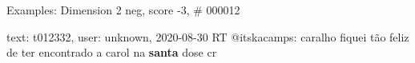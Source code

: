 \begin{frame}{Examples: Dimension 2 neg, score -3, \# 000012}
\footnotesize
\begin{alertblock}{text: t012332, user: unknown, 2020-08-30}
RT @itskacamps: caralho fiquei tão feliz de ter encontrado a carol na 
\textbf{santa} dose cr  
\end{alertblock}
\end{frame}
